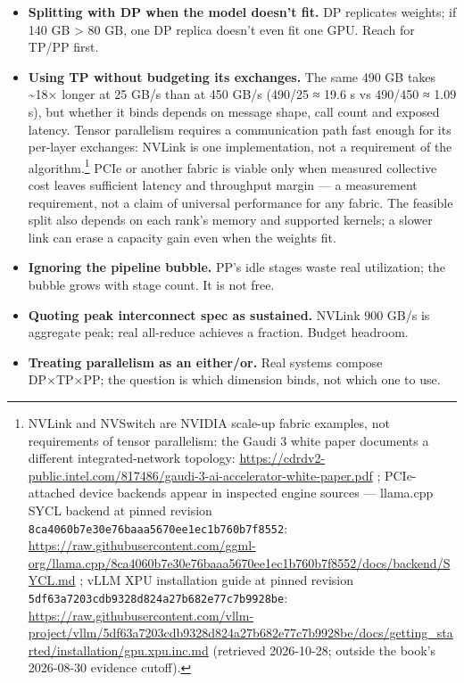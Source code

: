\begin{itemize}
\item
  \textbf{Splitting with DP when the model doesn't fit.} DP replicates
  weights; if 140 GB \textgreater{} 80 GB, one DP replica doesn't even
  fit one GPU. Reach for TP/PP first.
\item
  \textbf{Using TP without budgeting its exchanges.} The same 490 GB
  takes \textasciitilde18× longer at 25 GB/s than at 450 GB/s (490/25 ≈
  19.6 s vs 490/450 ≈ 1.09 s), but whether it binds depends on message
  shape, call count and exposed latency. Tensor parallelism requires a
  communication path fast enough for its per-layer exchanges: NVLink is
  one implementation, not a requirement of the algorithm.\footnote{NVLink
    and NVSwitch are NVIDIA scale-up fabric examples, not requirements
    of tensor parallelism: the Gaudi 3 white paper documents a different
    integrated-network topology:
    \url{https://cdrdv2-public.intel.com/817486/gaudi-3-ai-accelerator-white-paper.pdf}
    ; PCIe-attached device backends appear in inspected engine sources
    --- llama.cpp SYCL backend at pinned revision
    \texttt{8ca4060b7e30e76baaa5670ee1ec1b760b7f8552}:
    \url{https://raw.githubusercontent.com/ggml-org/llama.cpp/8ca4060b7e30e76baaa5670ee1ec1b760b7f8552/docs/backend/SYCL.md}
    ; vLLM XPU installation guide at pinned revision
    \texttt{5df63a7203cdb9328d824a27b682e77c7b9928be}:
    \url{https://raw.githubusercontent.com/vllm-project/vllm/5df63a7203cdb9328d824a27b682e77c7b9928be/docs/getting_started/installation/gpu.xpu.inc.md}
    (retrieved 2026-10-28; outside the book's 2026-08-30 evidence
    cutoff).} PCIe or another fabric is viable only when measured
  collective cost leaves sufficient latency and throughput margin --- a
  measurement requirement, not a claim of universal performance for any
  fabric. The feasible split also depends on each rank's memory and
  supported kernels; a slower link can erase a capacity gain even when
  the weights fit.
\item
  \textbf{Ignoring the pipeline bubble.} PP's idle stages waste real
  utilization; the bubble grows with stage count. It is not free.
\item
  \textbf{Quoting peak interconnect spec as sustained.} NVLink 900 GB/s
  is aggregate peak; real all-reduce achieves a fraction. Budget
  headroom.
\item
  \textbf{Treating parallelism as an either/or.} Real systems compose
  DP×TP×PP; the question is which dimension binds, not which one to use.
\end{itemize}

